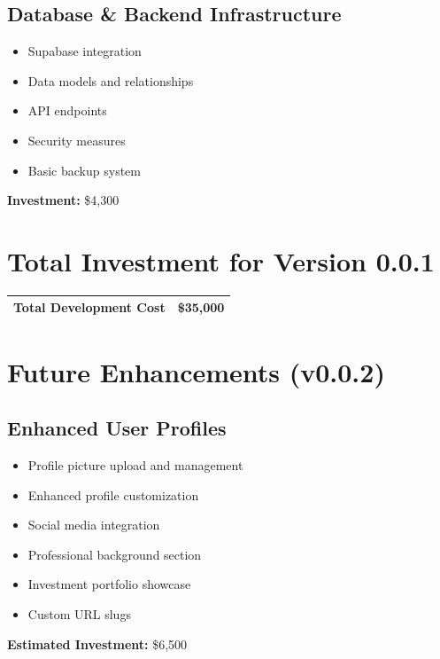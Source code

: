 \documentclass[11pt,a4paper]{article}
\begin{document}
\subsection{Database \& Backend Infrastructure}
\begin{tcolorbox}[colback=white,colframe=primaryBlue!20,title=Module Details]
\begin{itemize}[leftmargin=*]
    \item Supabase integration
    \item Data models and relationships
    \item API endpoints
    \item Security measures
    \item Basic backup system
\end{itemize}
\textbf{Investment:} \$4,300
\end{tcolorbox}

\section{Total Investment for Version 0.0.1}
\begin{center}
\begin{tabular}{lr}
\toprule
\textbf{Total Development Cost} & \textbf{\$35,000} \\
\bottomrule
\end{tabular}
\end{center}

\section{Future Enhancements (v0.0.2)}

\subsection{Enhanced User Profiles}
\begin{tcolorbox}[colback=white,colframe=accentPurple!20,title=Planned Features]
\begin{itemize}[leftmargin=*]
    \item Profile picture upload and management
    \item Enhanced profile customization
    \item Social media integration
    \item Professional background section
    \item Investment portfolio showcase
    \item Custom URL slugs
\end{itemize}
\textbf{Estimated Investment:} \$6,500
\end{tcolorbox}
\end{document}
